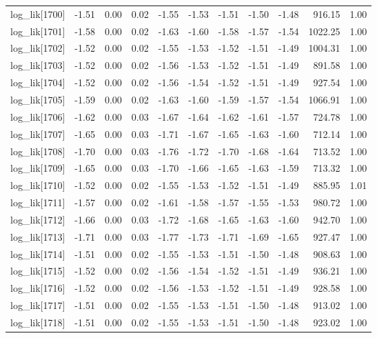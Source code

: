 \begin{table}[ht]
\begin{tabular}{rrrrrrrrrrr}
  log\_lik[1700] & -1.51 & 0.00 & 0.02 & -1.55 & -1.53 & -1.51 & -1.50 & -1.48 & 916.15 & 1.00 \\ 
  log\_lik[1701] & -1.58 & 0.00 & 0.02 & -1.63 & -1.60 & -1.58 & -1.57 & -1.54 & 1022.25 & 1.00 \\ 
  log\_lik[1702] & -1.52 & 0.00 & 0.02 & -1.55 & -1.53 & -1.52 & -1.51 & -1.49 & 1004.31 & 1.00 \\ 
  log\_lik[1703] & -1.52 & 0.00 & 0.02 & -1.56 & -1.53 & -1.52 & -1.51 & -1.49 & 891.58 & 1.00 \\ 
  log\_lik[1704] & -1.52 & 0.00 & 0.02 & -1.56 & -1.54 & -1.52 & -1.51 & -1.49 & 927.54 & 1.00 \\ 
  log\_lik[1705] & -1.59 & 0.00 & 0.02 & -1.63 & -1.60 & -1.59 & -1.57 & -1.54 & 1066.91 & 1.00 \\ 
  log\_lik[1706] & -1.62 & 0.00 & 0.03 & -1.67 & -1.64 & -1.62 & -1.61 & -1.57 & 724.78 & 1.00 \\ 
  log\_lik[1707] & -1.65 & 0.00 & 0.03 & -1.71 & -1.67 & -1.65 & -1.63 & -1.60 & 712.14 & 1.00 \\ 
  log\_lik[1708] & -1.70 & 0.00 & 0.03 & -1.76 & -1.72 & -1.70 & -1.68 & -1.64 & 713.52 & 1.00 \\ 
  log\_lik[1709] & -1.65 & 0.00 & 0.03 & -1.70 & -1.66 & -1.65 & -1.63 & -1.59 & 713.32 & 1.00 \\ 
  log\_lik[1710] & -1.52 & 0.00 & 0.02 & -1.55 & -1.53 & -1.52 & -1.51 & -1.49 & 885.95 & 1.01 \\ 
  log\_lik[1711] & -1.57 & 0.00 & 0.02 & -1.61 & -1.58 & -1.57 & -1.55 & -1.53 & 980.72 & 1.00 \\ 
  log\_lik[1712] & -1.66 & 0.00 & 0.03 & -1.72 & -1.68 & -1.65 & -1.63 & -1.60 & 942.70 & 1.00 \\ 
  log\_lik[1713] & -1.71 & 0.00 & 0.03 & -1.77 & -1.73 & -1.71 & -1.69 & -1.65 & 927.47 & 1.00 \\ 
  log\_lik[1714] & -1.51 & 0.00 & 0.02 & -1.55 & -1.53 & -1.51 & -1.50 & -1.48 & 908.63 & 1.00 \\ 
  log\_lik[1715] & -1.52 & 0.00 & 0.02 & -1.56 & -1.54 & -1.52 & -1.51 & -1.49 & 936.21 & 1.00 \\ 
  log\_lik[1716] & -1.52 & 0.00 & 0.02 & -1.56 & -1.53 & -1.52 & -1.51 & -1.49 & 928.58 & 1.00 \\ 
  log\_lik[1717] & -1.51 & 0.00 & 0.02 & -1.55 & -1.53 & -1.51 & -1.50 & -1.48 & 913.02 & 1.00 \\ 
  log\_lik[1718] & -1.51 & 0.00 & 0.02 & -1.55 & -1.53 & -1.51 & -1.50 & -1.48 & 923.02 & 1.00 \\ 

\end{tabular}
\end{table}
